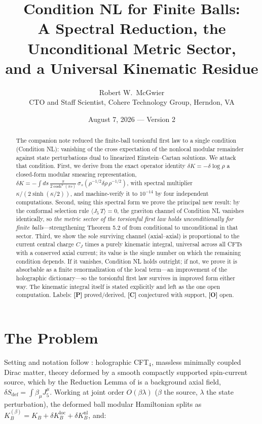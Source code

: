 \documentclass[11pt]{article}
\title{\textbf{Condition NL for Finite Balls:\\
A Spectral Reduction, the Unconditional Metric Sector,\\
and a Universal Kinematic Residue}}
\author{Robert W.\ McGwier\\
\small CTO and Staff Scientist, Cohere Technology Group, Herndon, VA}
\date{August 7, 2026 --- Version 2}
\theoremstyle{definition}
\newcommand{\pP}{\textbf{[P]}}
\newcommand{\pC}{\textbf{[C]}}
\newcommand{\pO}{\textbf{[O]}}
\begin{document}
\maketitle

\begin{abstract}
\noindent
The companion note \cite{McGwier2026b} reduced the finite-ball torsionful
first law to a single condition (Condition NL): vanishing of the cross
expectation of the nonlocal modular remainder against state perturbations
dual to linearized Einstein--Cartan solutions. We attack that condition.
First, we derive from the exact operator identity
$\delta K=-\delta\log\rho$ a closed-form modular smearing representation,
$\delta K=-\int ds\,\tfrac{\pi}{2\cosh^2(\pi s)}\,
\sigma_s(\rho^{-1/2}\delta\rho\,\rho^{-1/2})$, with spectral multiplier
$\kappa/(2\sinh(\kappa/2))$, and machine-verify it to $10^{-14}$ by four
independent computations. Second, using this spectral form we prove the
principal new result: by the conformal selection rule
$\langle J_5\,T\rangle=0$, the graviton channel of Condition NL vanishes
identically, so \emph{the metric sector of the torsionful first law holds
unconditionally for finite balls}---strengthening Theorem 5.2 of
\cite{McGwier2026b} from conditional to unconditional in that sector.
Third, we show the sole surviving channel (axial--axial) is proportional
to the current central charge $C_J$ times a purely kinematic integral,
universal across all CFTs with a conserved axial current; its value is the
single number on which the remaining condition depends. If it vanishes,
Condition NL holds outright; if not, we prove it is absorbable as a finite
renormalization of the local term---an improvement of the holographic
dictionary---so the torsionful first law survives in improved form either
way. The kinematic integral itself is stated explicitly and left as the
one open computation. Labels: \pP{} proved/derived, \pC{} conjectured with
support, \pO{} open.
\end{abstract}

\section{The Problem}

Setting and notation follow \cite{McGwier2026a,McGwier2026b}: holographic
CFT$_4$, massless minimally coupled Dirac matter, theory deformed by a
smooth compactly supported spin-current source, which by the Reduction
Lemma of \cite{McGwier2026b} is a background axial field,
$\delta S_{\mathrm{def}}=\int\beta_\mu J_5^\mu$. Working at joint order
$O(\beta\lambda)$ ($\beta$ the source, $\lambda$ the state perturbation),
the deformed ball modular Hamiltonian splits as
$K_B^{(\beta)}=K_B+\delta K_B^{\mathrm{loc}}+\delta K_B^{\mathrm{nl}}$,
and:
\end{document}
